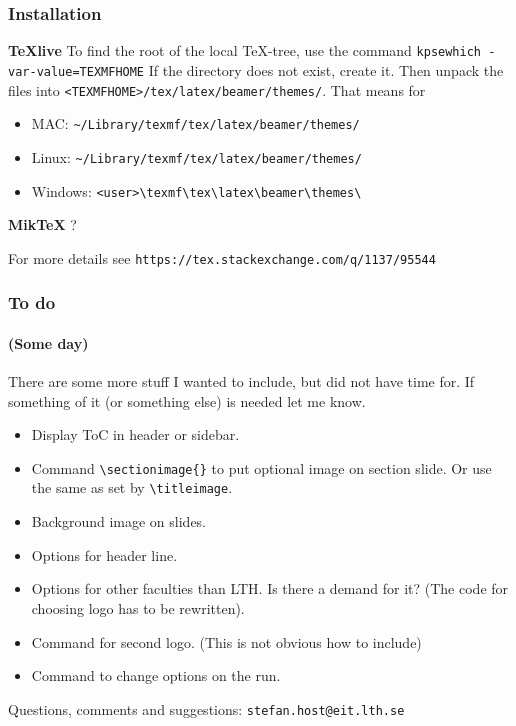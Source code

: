 \documentclass[aspectratio=1610]{beamer}
\begin{document}
\begin{frame}[plain]
  \titlepage
\end{frame}
\titleimage{}

\begin{frame}[fragile]
  \frametitle{Installation}
  \textbf{TeXlive}\newline
  To find the root of the local TeX-tree, use the command\newline
  \verb|kpsewhich -var-value=TEXMFHOME|\newline
  If the directory does not exist, create it. Then unpack the files into \verb|<TEXMFHOME>/tex/latex/beamer/themes/|. That means for 
  \begin{itemize}
  \item MAC: \verb|~/Library/texmf/tex/latex/beamer/themes/|
  \item Linux: \verb|~/Library/texmf/tex/latex/beamer/themes/|
  \item Windows: \verb|<user>\texmf\tex\latex\beamer\themes\|
  \end{itemize}
  \textbf{MikTeX}\newline
  ?
  \par\strut\par
  For more details see \verb|https://tex.stackexchange.com/q/1137/95544|
\end{frame}

\begin{frame}[fragile]
  \frametitle{To do}
  \framesubtitle{(Some day)}
  There are some more stuff I wanted to include, but did not have time for. If something of it (or something else) is needed let me know. 
  \begin{itemize}
  \item Display ToC in header or sidebar.
  \item Command \verb|\sectionimage{}| to put optional image on section slide. Or use the same as set by \verb|\titleimage|.
  \item Background image on slides.
  \item Options for header line.
  \item Options for other faculties than LTH. Is there a demand for it? (The code for choosing logo has to be rewritten).
  \item Command for second logo. (This is not obvious how to include)
  \item Command to change options on the run.
  \end{itemize}
  Questions, comments and suggestions: \verb|stefan.host@eit.lth.se|
\end{frame}
\end{document}
